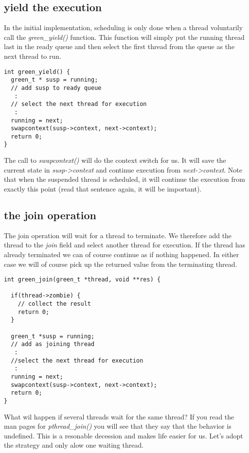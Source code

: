\documentclass[a4paper,11pt]{article}
\begin{document}
\subsection{yield the execution}

In the initial implementation, scheduling is only done when a thread
voluntarily call the {\em green\_yield()} function. This function will
simply put the running thread last in the ready queue and then select
the first thread from the queue as the next thread to run. 

\begin{lstlisting}
int green_yield() {
  green_t * susp = running;
  // add susp to ready queue
   :
  // select the next thread for execution
   :
  running = next;
  swapcontext(susp->context, next->context);
  return 0;
}
\end{lstlisting}


The call to {\em swapcontext()} will do the context switch for us. It
will save the current state in {\em susp->context} and continue
execution from {\em next->context}. Note that when the suspended
thread is scheduled, it will continue the execution from exactly this
point (read that sentence again, it will be important).

\subsection{the join operation}

The join operation will wait for a thread to terminate. We therefore
add the thread to the {\em join} field and select another thread for
execution. If the thread has already terminated we can of course
continue as if nothing happened. In either case we will of course pick
up the returned value from the terminating thread.

\begin{lstlisting}
int green_join(green_t *thread, void **res) {

  if(thread->zombie) {
    // collect the result
    return 0;
  }

  green_t *susp = running;
  // add as joining thread
   :
  //select the next thread for execution 
   :
  running = next;
  swapcontext(susp->context, next->context);
  return 0;  
}
\end{lstlisting}

What wil happen if several threads wait for the same thread? If you
read the man pages for {\em pthread\_join()} you will see that they
say that the behavior is undefined. This is a resonable decession and
makes life easier for us. Let's adopt the strategy and only alow one
waiting thread.
\end{document}
